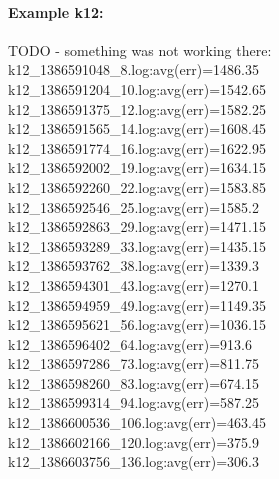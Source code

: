 \paragraph{Example k12:}
TODO - something was not working there: 
k12\_1386591048\_8.log:avg(err)=1486.35 \\
k12\_1386591204\_10.log:avg(err)=1542.65 \\
k12\_1386591375\_12.log:avg(err)=1582.25 \\
k12\_1386591565\_14.log:avg(err)=1608.45 \\
k12\_1386591774\_16.log:avg(err)=1622.95 \\
k12\_1386592002\_19.log:avg(err)=1634.15 \\
k12\_1386592260\_22.log:avg(err)=1583.85 \\
k12\_1386592546\_25.log:avg(err)=1585.2 \\
k12\_1386592863\_29.log:avg(err)=1471.15 \\
k12\_1386593289\_33.log:avg(err)=1435.15 \\
k12\_1386593762\_38.log:avg(err)=1339.3 \\
k12\_1386594301\_43.log:avg(err)=1270.1 \\
k12\_1386594959\_49.log:avg(err)=1149.35 \\
k12\_1386595621\_56.log:avg(err)=1036.15 \\
k12\_1386596402\_64.log:avg(err)=913.6 \\
k12\_1386597286\_73.log:avg(err)=811.75 \\
k12\_1386598260\_83.log:avg(err)=674.15 \\
k12\_1386599314\_94.log:avg(err)=587.25 \\
k12\_1386600536\_106.log:avg(err)=463.45 \\
k12\_1386602166\_120.log:avg(err)=375.9 \\
k12\_1386603756\_136.log:avg(err)=306.3 \\

